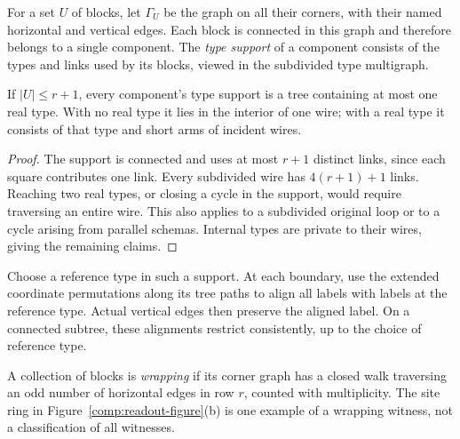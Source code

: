 For a set $U$ of blocks, let $\Gamma_U$ be the graph on all their corners,
with their named horizontal and vertical edges.  Each block is connected
in this graph and therefore belongs to a single component.  The
\emph{type support} of a component consists of the types and links used
by its blocks, viewed in the subdivided type multigraph.

\begin{lemma}\label{comp:support}
If $|U|\leq r+1$, every component's type support is a tree containing at
most one real type.  With no real type it lies in the interior of one
wire; with a real type it consists of that type and short arms of
incident wires.
\end{lemma}
\begin{proof}
The support is connected and uses at most $r+1$ distinct links, since
each square contributes one link.  Every subdivided wire has
$4(r+1)+1$ links.  Reaching two real types, or closing a cycle in the
support, would require traversing an entire wire.  This also applies to
a subdivided original loop or to a cycle arising from parallel schemas.
Internal types are private to their wires, giving the remaining claims.
\end{proof}

Choose a reference type in such a support.  At each boundary, use the
extended coordinate permutations along its tree paths to align all
labels with labels at the reference type.  Actual vertical edges then
preserve the aligned label.  On a connected subtree, these alignments
restrict consistently, up to the choice of reference type.

A collection of blocks is \emph{wrapping} if its corner graph has a
closed walk traversing an odd number of horizontal edges in row $r$,
counted with multiplicity.
The site ring in Figure~\ref{comp:readout-figure}(b) is one example
of a wrapping witness, not a classification of all witnesses.

